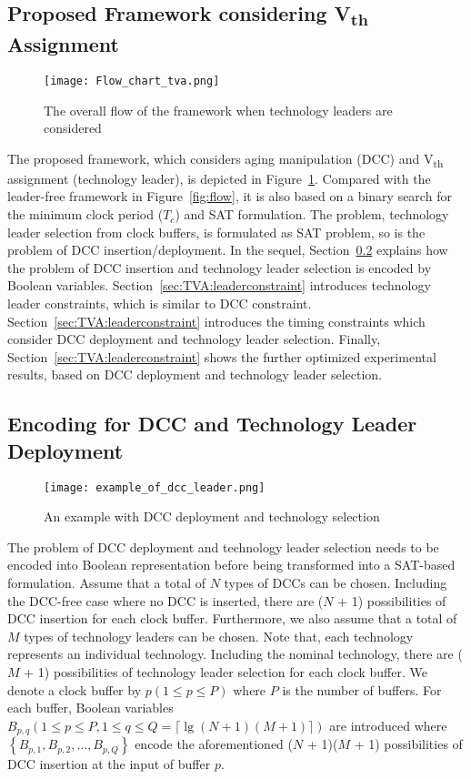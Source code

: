 \subsection{Proposed Framework considering V\textsubscript{th} Assignment}
\label{sec:TVA:framework}
\begin{figure}
	\centering
	\texttt{[image: Flow\_chart\_tva.png]}
	\caption{The overall flow of the framework when technology leaders are considered }
	\label{fig:flow:tva}
\end{figure}
The proposed framework, which considers aging manipulation (DCC) and V\textsubscript{th} assignment (technology leader), is depicted in Figure~\ref{fig:flow:tva}. Compared with the leader-free framework in Figure~\ref{fig:flow}, it is also based on a binary search for the minimum clock period ($T_c$) and SAT formulation. The problem, technology leader selection from clock buffers, is formulated as SAT problem, so is the problem of DCC insertion/deployment. In the sequel, Section~\ref{sec:TVA:leader_encode} explains how the problem of DCC insertion and technology leader selection is encoded by Boolean variables. Section~\ref{sec:TVA:leaderconstraint} introduces technology leader constraints, which is similar to DCC constraint. Section~\ref{sec:TVA:leaderconstraint} introduces the timing constraints which consider DCC deployment and technology leader selection. Finally,  Section~\ref{sec:TVA:leaderconstraint} shows the further optimized experimental results, based on DCC deployment and technology leader selection.

\subsection{Encoding for DCC and Technology Leader Deployment}
\label{sec:TVA:leader_encode}
\begin{figure}
    \centering
    \texttt{[image: example\_of\_dcc\_leader.png]}
    \caption{An example with DCC deployment and technology selection}
    \label{fig:example_dcc_tva}
\end{figure}
The problem of DCC deployment and technology leader selection needs to be encoded into Boolean representation before being transformed into a SAT-based formulation. Assume that a total of $N$ types of DCCs can be chosen. Including the DCC-free case where no DCC is inserted, there are ($N$ + 1) possibilities of DCC insertion for each clock buffer. Furthermore, we also assume that a total of $M$ types of technology leaders can be chosen. Note that, each technology represents an individual technology. Including the nominal technology, there are ($M$ + 1) possibilities of technology leader selection for each clock buffer. We denote a clock buffer by $p\left(1 \leq p \leq P\right)$ where $P$ is the number of buffers. For each buffer, Boolean variables $B_{p,q}\left(1 \leq p \leq P, 1 \leq q \leq Q = \lceil \lg (N + 1)(M + 1)\rceil \right)$ are introduced where $\left\{B_{p,1}, B_{p,2},\dotsc, B_{p,Q}\right\}$ encode the aforementioned ($N$ + 1)($M$ + 1) possibilities of DCC insertion at the input of buffer $p$.

